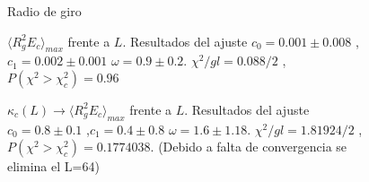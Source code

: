 \begin{figure}[h]
  \centering
  
  \caption{Radio de giro}
\end{figure}

\begin{figure}[h]
  \centering
  
  \caption{$\langle R_g^2 E_c\rangle_{max}$ frente a $L$. Resultados del
    ajuste $c_0=0.001\pm 0.008$ ,$c_1=0.002\pm 0.001 $ $\omega=0.9 \pm
    0.2$. $\chi^2/gl=0.088/2$ , $P(\chi^2>\chi_c^2)=0.96$ }






\end{figure}

\begin{figure}[h]
  \centering
  
  \caption{$\kappa_c(L)\rightarrow\langle R_g^2 E_c\rangle_{max}$ frente a $L$. Resultados del ajuste $c_0=0.8\pm 0.1$ ,$c_1=0.4\pm 0.8 $ $\omega=1.6 \pm
    1.18$. $\chi^2/gl=1.81924/2$ , $P(\chi^2>\chi_c^2)=0.1774038$. (Debido a falta de convergencia se elimina el L=64)}







\end{figure}
\clearpage

